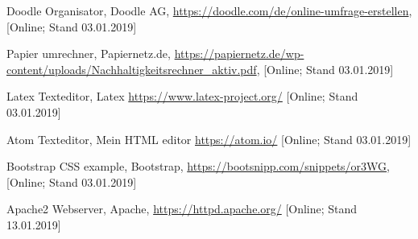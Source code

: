 \documentclass[12pt,twoside]{article}  %
\begin{document}
\begin{thebibliography}{15}
	    Doodle Organisator,
		            Doodle AG,
		            \url{https://doodle.com/de/online-umfrage-erstellen},
			    [Online; Stand 03.01.2019]

         Papier umrechner,
			    Papiernetz.de,
	                    \url{https://papiernetz.de/wp-content/uploads/Nachhaltigkeitsrechner_aktiv.pdf},
                            [Online; Stand 03.01.2019]

             Latex Texteditor,
			    Latex
			    \url{https://www.latex-project.org/}
			    [Online; Stand 03.01.2019]

              Atom Texteditor,
			    Mein HTML editor
			    \url{https://atom.io/}
			    [Online; Stand 03.01.2019]

         Bootstrap CSS example,
	                            Bootstrap,
			            \url{https://bootsnipp.com/snippets/or3WG},
				    [Online; Stand 03.01.2019]


	    Apache2 Webserver,
			    Apache,
			    \url{https://httpd.apache.org/}
			    [Online; Stand 13.01.2019]
    \end{thebibliography}
\end{document}
